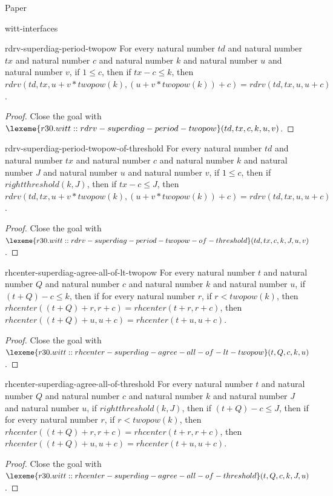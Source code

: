 \begin{lexlean}{Paper}
\begin{section}{witt-interfaces}
  \begin{theorem}{rdrv-superdiag-period-twopow}
  For every natural number \(td\) and natural number \(tx\) and natural number \(c\) and natural number \(k\) and natural number \(u\) and natural number \(v\), if \(1 ≤ c\), then if \(tx - c ≤ k\), then \(rdrv(td, tx, u + v * twopow(k), (u + v * twopow(k)) + c) = rdrv(td, tx, u, u + c)\).
  \begin{proof}
  Close the goal with \(\lexeme{r30.witt::rdrv-superdiag-period-twopow}(td, tx, c, k, u, v)\).
  \end{proof}
  \end{theorem}

  \begin{theorem}{rdrv-superdiag-period-twopow-of-threshold}
  For every natural number \(td\) and natural number \(tx\) and natural number \(c\) and natural number \(k\) and natural number \(J\) and natural number \(u\) and natural number \(v\), if \(1 ≤ c\), then if \(rightthreshold(k, J)\), then if \(tx - c ≤ J\), then \(rdrv(td, tx, u + v * twopow(k), (u + v * twopow(k)) + c) = rdrv(td, tx, u, u + c)\).
  \begin{proof}
  Close the goal with \(\lexeme{r30.witt::rdrv-superdiag-period-twopow-of-threshold}(td, tx, c, k, J, u, v)\).
  \end{proof}
  \end{theorem}

  \begin{theorem}{rhcenter-superdiag-agree-all-of-lt-twopow}
  For every natural number \(t\) and natural number \(Q\) and natural number \(c\) and natural number \(k\) and natural number \(u\), if \((t + Q) - c ≤ k\), then if for every natural number \(r\), if \(r < twopow(k)\), then \(rhcenter((t + Q) + r, r + c) = rhcenter(t + r, r + c)\), then \(rhcenter((t + Q) + u, u + c) = rhcenter(t + u, u + c)\).
  \begin{proof}
  Close the goal with \(\lexeme{r30.witt::rhcenter-superdiag-agree-all-of-lt-twopow}(t, Q, c, k, u)\).
  \end{proof}
  \end{theorem}

  \begin{theorem}{rhcenter-superdiag-agree-all-of-threshold}
  For every natural number \(t\) and natural number \(Q\) and natural number \(c\) and natural number \(k\) and natural number \(J\) and natural number \(u\), if \(rightthreshold(k, J)\), then if \((t + Q) - c ≤ J\), then if for every natural number \(r\), if \(r < twopow(k)\), then \(rhcenter((t + Q) + r, r + c) = rhcenter(t + r, r + c)\), then \(rhcenter((t + Q) + u, u + c) = rhcenter(t + u, u + c)\).
  \begin{proof}
  Close the goal with \(\lexeme{r30.witt::rhcenter-superdiag-agree-all-of-threshold}(t, Q, c, k, J, u)\).
  \end{proof}
  \end{theorem}


\end{section}
\end{lexlean}
